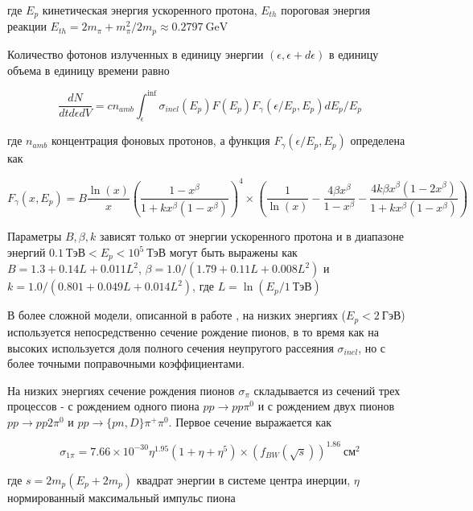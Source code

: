 где $E_p$ кинетическая энергия ускоренного протона, $E_{th}$ пороговая энергия реакции $E_{th} = 2m_{\pi}+m^2_{\pi}/2m_p \approx 0.2797~\text{GeV}$

Количество фотонов излученных в единицу энергии $\left(\epsilon, \epsilon+d\epsilon\right)$ в единицу объема в единицу времени равно

\begin{equation}
	\frac{dN}{dt d\epsilon dV} = c n_{amb} \int_{\epsilon}^{\inf}\sigma_{inel}(E_p)F(E_p)F_{\gamma}(\epsilon/E_p, E_p) dE_p/E_p
\end{equation} 

где $n_{amb}$ концентрация фоновых протонов, а функция $F_{\gamma}(\epsilon/E_p, E_p)$ определена как

\begin{equation}
	F_{\gamma}(x, E_p) = B \frac{\ln(x)}{x} \left(\frac{1-x^\beta}{1+k x^{\beta}\left(1-x^\beta\right)}\right)^4\times\left(\frac{1}{\ln(x)}-\frac{4\beta x^\beta}{1-x^\beta}-\frac{4 k\beta x^\beta\left(1-2x^\beta\right)}{1+k x^\beta\left(1-x^\beta\right)}\right)
\end{equation}

Параметры $B, \beta, k$ зависят только от энергии ускоренного протона и в диапазоне энергий $0.1~\text{ТэВ} < E_p < 10^5~\text{ТэВ}$ могут быть выражены как $B = 1.3 + 0.14 L + 0.011 L^2$, $\beta = 1.0/\left(1.79 + 0.11 L  + 0.008 L^2\right)$ и $k = 1.0/\left(0.801 + 0.049 L + 0.014 L^2\right)$, где $L = \ln\left(E_p/1~\text{ТэВ}\right)$

В более сложной модели, описанной в работе \cite{Kafexhiu}, на низких энергиях ($E_p < 2~\text{ГэВ}$) используется непосредственно сечение рождение пионов, в то время как на высоких используется доля полного сечения неупругого рассеяния $\sigma_{inel}$, но с более точными поправочными коэффициентами.

На низких энергиях сечение рождения пионов  $\sigma_{\pi}$ складывается из сечений трех процессов - с рождением одного пиона $pp\rightarrow pp\pi^0$ и с рождением двух пионов $pp\rightarrow pp2\pi^0$ и $pp\rightarrow \{pn,D\}\pi^{+}\pi^0$. Первое сечение выражается как

\begin{equation}
	\sigma_{1\pi} = 7.66\times10^{-30}\eta^{1.95}\left(1 + \eta + \eta^5\right)\times\left(f_{BW}\left(\sqrt s\right)\right)^{1.86}~\text{см}^{2}
\end{equation}

где $s = 2 m_p \left(E_p+2m_p\right)$ квадрат энергии в системе центра инерции, $\eta$ нормированный максимальный импульс пиона

